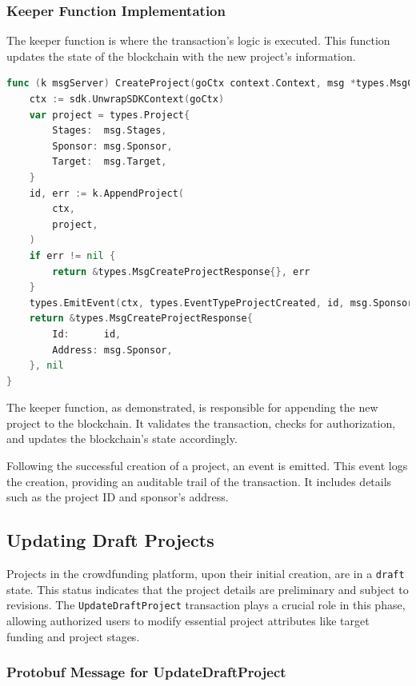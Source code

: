 \subsubsection{Keeper Function Implementation}
\label{subsubsec:keeper-createproject}

The keeper function is where the transaction's logic is executed. This function updates the state of the blockchain with the new project's information.

\begin{lstlisting}[language=go, caption=Keeper implementation for CreateProject, label={lst:keeper_create_project}]
func (k msgServer) CreateProject(goCtx context.Context, msg *types.MsgCreateProject) (*types.MsgCreateProjectResponse, error) {
	ctx := sdk.UnwrapSDKContext(goCtx)
	var project = types.Project{
		Stages:  msg.Stages,
		Sponsor: msg.Sponsor,
		Target:  msg.Target,
	}
	id, err := k.AppendProject(
		ctx,
		project,
	)
	if err != nil {
		return &types.MsgCreateProjectResponse{}, err
	}
	types.EmitEvent(ctx, types.EventTypeProjectCreated, id, msg.Sponsor)
	return &types.MsgCreateProjectResponse{
		Id:      id,
		Address: msg.Sponsor,
	}, nil
}
\end{lstlisting}

The keeper function, as demonstrated, is responsible for appending the new project to the blockchain. It validates the transaction, checks for authorization, and updates the blockchain's state accordingly.

Following the successful creation of a project, an event is emitted. This event logs the creation, providing an auditable trail of the transaction. It includes details such as the project ID and sponsor's address.


\subsection{Updating Draft Projects}
\label{subsec:updating-draft-projects}

Projects in the crowdfunding platform, upon their initial creation, are in a \texttt{draft} state. This status indicates that the project details are preliminary and subject to revisions. The \texttt{UpdateDraftProject} transaction plays a crucial role in this phase, allowing authorized users to modify essential project attributes like target funding and project stages.

\subsubsection{Protobuf Message for UpdateDraftProject}
\label{subsubsec:protobuf-update-draft-project}

